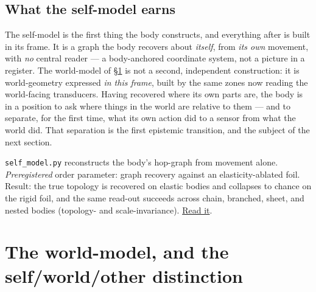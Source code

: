 \documentclass{article}
\newcommand{\rtdlink}[2]{\href{https://smn-lab.readthedocs.io/en/latest/#1}{#2}}
\begin{document}
\subsection{What the self-model earns}\label{sec:selfmodel-earns}

The self-model is the first thing the body constructs, and everything
after is built in its frame.  It is a graph the body recovers about
\emph{itself}, from \emph{its own} movement, with \emph{no} central
reader --- a body-anchored coordinate system, not a picture in a
register.  The world-model of \S\ref{sec:worldmodel} is not a second,
independent construction: it is world-geometry expressed \emph{in this
frame}, built by the same zones now reading the world-facing
transducers.  Having recovered where its own parts are, the body is in a
position to ask where things in the world are relative to them --- and to
separate, for the first time, what its own action did to a sensor from
what the world did.  That separation is the first epistemic transition,
and the subject of the next section.

\begin{benchbox}
\texttt{self\_model.py} reconstructs the body's hop-graph from movement
alone.  \emph{Preregistered} order parameter: graph recovery against an
elasticity-ablated foil.  Result: the true topology is recovered on
elastic bodies and collapses to chance on the rigid foil, and the same
read-out succeeds across chain, branched, sheet, and nested bodies
(topology- and scale-invariance).  \rtdlink{experiments/self_model_topology/}{Read it}.
\end{benchbox}

\section{The world-model, and the self/world/other distinction}\label{sec:worldmodel}
\end{document}
